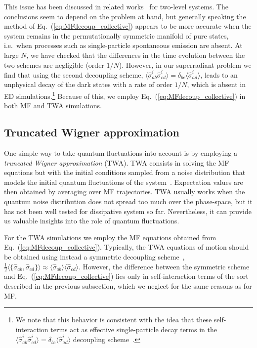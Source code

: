 \documentclass[aps,prx,superscriptaddress,twocolumn,notitlepage,nofootinbib,longbibliography]{revtex4-2}
\begin{document}
This issue has been discussed in related works~\cite{Carmichael_1980,OrioliRey_PRA2017,Tucker2020} for two-level systems. The conclusions seem to depend on the problem at hand, but generally speaking the method of Eq.~(\ref{eq:MFdecoup_collective}) appears to be more accurate when the system remains in the permutationally symmetric manifold of pure states, i.e.~when processes such as single-particle spontaneous emission are absent.
At large $N$, we have checked that the differences in the time evolution between the two schemes are negligible (order $1/N$).
However, in our superradiant problem we find that using the second decoupling scheme, $\langle \hat{\sigma}^i_{ab} \hat{\sigma}^i_{cd} \rangle = \delta_{bc} \langle \hat{\sigma}^i_{ad} \rangle$, leads to an unphysical decay of the dark states with a rate of order $1/N$, which is absent in ED simulations.\footnote{We note that this behavior is consistent with the idea that these self-interaction terms act as effective single-particle decay terms in the $\langle \hat{\sigma}^i_{ab} \hat{\sigma}^i_{cd} \rangle = \delta_{bc} \langle \hat{\sigma}^i_{ad} \rangle$ decoupling scheme~\cite{Tucker2020}.}
Because of this, we employ Eq.~(\ref{eq:MFdecoup_collective}) in both MF and TWA simulations.







\subsection{Truncated Wigner approximation}

One simple way to take quantum fluctuations into account is by employing a \emph{truncated Wigner approximation} (TWA). TWA consists in solving the MF equations but with the initial conditions sampled from a noise distribution that models the initial quantum fluctuations of the system~\cite{Polkovnikov_2009}. Expectation values are then obtained by averaging over MF trajectories. TWA usually works when the quantum noise distribution does not spread too much over the phase-space, but it has not been well tested for dissipative system so far.
Nevertheless, it can provide us valuable insights into the role of quantum fluctuations.

For the TWA simulations we employ the MF equations obtained from Eq.~(\ref{eq:MFdecoup_collective}). Typically, the TWA equations of motion should be obtained using instead a symmetric decoupling scheme~\cite{Polkovnikov_2009}, $\frac{1}{2} \langle \{ \hat{\sigma}_{ab}, \hat{\sigma}_{cd}\} \rangle \approx \langle \hat{\sigma}_{ab} \rangle \langle \hat{\sigma}_{cd} \rangle$. However, the difference between the symmetric scheme and Eq.~(\ref{eq:MFdecoup_collective}) lies only in self-interaction terms of the sort described in the previous subsection, which we neglect for the same reasons as for MF.
\end{document}
